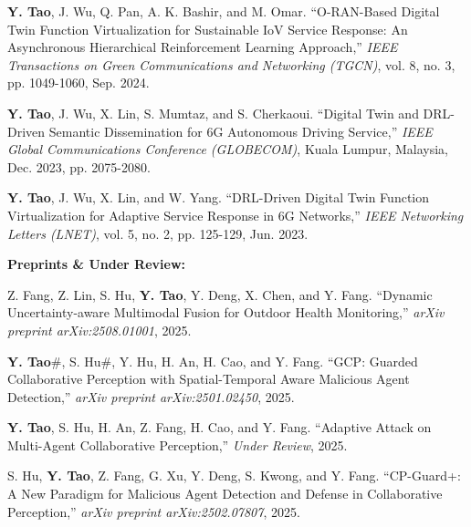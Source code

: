 \documentclass[letterpaper,11pt]{article}
\begin{document}
{{{{{{\begin{justify}
    \normalsize
    \textbf{Y. Tao}, J. Wu, Q. Pan, A. K. Bashir, and M. Omar. ``O-RAN-Based Digital Twin Function Virtualization for Sustainable IoV Service Response: An Asynchronous Hierarchical Reinforcement Learning Approach,'' \textit{IEEE Transactions on Green Communications and Networking (TGCN)}, vol. 8, no. 3, pp. 1049-1060, Sep. 2024.
\end{justify}
\begin{justify}
    \normalsize
    \textbf{Y. Tao}, J. Wu, X. Lin, S. Mumtaz, and S. Cherkaoui. ``Digital Twin and DRL-Driven Semantic Dissemination for 6G Autonomous Driving Service,'' \textit{IEEE Global Communications Conference (GLOBECOM)}, Kuala Lumpur, Malaysia, Dec. 2023, pp. 2075-2080.
\end{justify}
\begin{justify}
    \normalsize
    \textbf{Y. Tao}, J. Wu, X. Lin, and W. Yang. ``DRL-Driven Digital Twin Function Virtualization for Adaptive Service Response in 6G Networks,'' \textit{IEEE Networking Letters (LNET)}, vol. 5, no. 2, pp. 125-129, Jun. 2023.
\end{justify}

\vspace{2mm}
\large\textbf{Preprints \& Under Review:}

\begin{justify}
    \normalsize
    Z. Fang, Z. Lin, S. Hu, \textbf{Y. Tao}, Y. Deng, X. Chen, and Y. Fang. ``Dynamic Uncertainty-aware Multimodal Fusion for Outdoor Health Monitoring,'' \textit{arXiv preprint arXiv:2508.01001}, 2025.
\end{justify}

\begin{justify}
    \normalsize
    \textbf{Y. Tao}\#, S. Hu\#, Y. Hu, H. An, H. Cao, and Y. Fang. ``GCP: Guarded Collaborative Perception with Spatial-Temporal Aware Malicious Agent Detection,'' \textit{arXiv preprint arXiv:2501.02450}, 2025.
\end{justify}

\begin{justify}
    \normalsize
    \textbf{Y. Tao}, S. Hu, H. An, Z. Fang, H. Cao, and Y. Fang. ``Adaptive Attack on Multi-Agent Collaborative Perception,'' \textit{Under Review}, 2025.
\end{justify}

\begin{justify}
    \normalsize
    S. Hu, \textbf{Y. Tao}, Z. Fang, G. Xu, Y. Deng, S. Kwong, and Y. Fang. ``CP-Guard+: A New Paradigm for Malicious Agent Detection and Defense in Collaborative Perception,'' \textit{arXiv preprint arXiv:2502.07807}, 2025.
\end{justify}

}}}}}}
\end{document}
